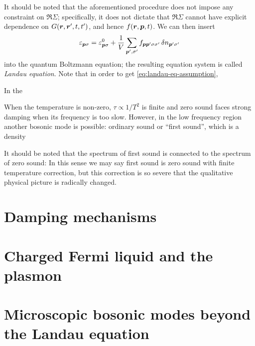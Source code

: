 \documentclass[hyperref, a4paper]{article}
\newcommand*{\term}[1]{\textit{#1}}
\begin{document}
It should be noted that the aforementioned procedure 
does not impose any constraint on $\Re \Sigma$;
specifically, it does not dictate that $\Re \Sigma$
cannot have explicit dependence on $G(\vb*{r}, \vb*{r}', t, t')$, 
and hence $f(\vb*{r}, \vb*{p}, t)$.
We can then insert 
\begin{equation}
    \varepsilon_{\vb*{p} \sigma} = \varepsilon^0_{\vb*{p} \sigma} + 
    \frac{1}{V} \sum_{\vb*{p}', \sigma'} f_{\vb*{p} \vb*{p}' \sigma \sigma'} \var{n}_{\vb*{p}' \sigma'}
    \label{eq:landau-eq-assumption}
\end{equation}
into the quantum Boltzmann equation;
the resulting equation system is called \term{Landau equation}.
Note that in order to get \eqref{eq:landau-eq-assumption},

In the 

When the temperature is non-zero,
$\tau \propto 1 / T^2$ is finite 
and zero sound faces strong damping 
when its frequency is too slow.
However, in the low frequency region another bosonic mode is possible:
ordinary sound or ``first sound'',
which is a density 

It should be noted that the spectrum of first sound 
is connected to the spectrum of zero sound:
In this sense we may say first sound is 
zero sound with finite temperature correction, 
but this correction is so severe that the qualitative physical picture 
is radically changed. 

\section{Damping mechanisms}



\section{Charged Fermi liquid and the plasmon}

\section{Microscopic bosonic modes beyond the Landau equation}\label{sec:microscopic-bosonic-modes}
\end{document}
